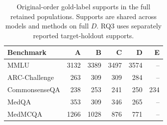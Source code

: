 \begin{table}[htbp]
\centering\small\setlength{\tabcolsep}{4pt}
\caption{Original-order gold-label supports in the full retained populations. Supports are shared across models and methods on full $D$. RQ3 uses separately reported target-holdout supports.}
\label{tab:label-supports}
\begin{tabular}{lrrrrr}
\toprule
Benchmark & A & B & C & D & E\\
\midrule
MMLU & 3132 & 3389 & 3497 & 3574 & --\\
ARC-Challenge & 263 & 309 & 309 & 284 & --\\
CommonsenseQA & 238 & 253 & 241 & 250 & 234\\
MedQA & 353 & 309 & 346 & 265 & --\\
MedMCQA & 1266 & 1028 & 876 & 771 & --\\
\bottomrule
\end{tabular}
\end{table}
